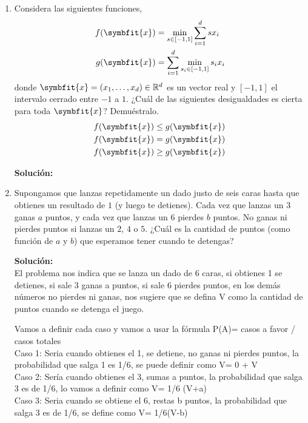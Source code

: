 \documentclass[11pt,letterpaper]{article}
\newenvironment{solution}{%
  \noindent\begin{shaded}
  \textbf{Solución:}\ }{
  \end{shaded}%
}
\newcommand{\bvec}[1]{\symbfit{#1}}
\begin{document}
\begin{enumerate}
\begin{solution}
  \end{solution}
\item%
  Considera las siguientes funciones,
  \[
  \begin{aligned}
    f(\bvec{x}) &= \min_{s\in[-1,1]}\sum_{i=1}^d sx_i \\
    g(\bvec{x}) &= \sum_{i=1}^d \min_{s_i\in[-1,1]} s_ix_i
  \end{aligned}
  \]
  donde \(\bvec{x} = (x_1,\dots,x_d)\in\mathbb{R}^d\) es un
  vector real y \([-1,1]\) el intervalo cerrado entre \(-1\) a
  \(1\). ¿Cuál de las siguientes desigualdades es cierta para toda
  \(\bvec{x}\)?  Demuéstralo.
  \[
  \begin{aligned}
    f(\bvec{x}) &\leq g(\bvec{x}) \\
    f(\bvec{x}) &= g(\bvec{x}) \\
    f(\bvec{x}) &\geq g(\bvec{x})
  \end{aligned}
  \]
  \begin{solution}
  \end{solution}    
\item%
  Supongamos que lanzas repetidamente un dado justo de seis caras
  hasta que obtienes un resultado de \(1\) (y luego te detienes).
  Cada vez que lanzas un \(3\) ganas \(a\) puntos, y cada vez que
  lanzas un \(6\) pierdes \(b\) puntos.  No ganas ni pierdes puntos si
  lanzas un \(2\), \(4\) o \(5\).  ¿Cuál es la cantidad de puntos
  (como función de \(a\) y \(b\)) que esperamos tener cuando te
  detengas?
  \begin{solution}
   \\ El problema nos indica que se lanza un dado de 6 caras, si obtienes 1 se detienes, si sale 3 ganas a puntos, si sale 6 pierdes puntos, en los demás números no pierdes ni ganas, nos sugiere que se defina V como la cantidad de puntos cuando se detenga el juego.

Vamos a definir cada caso y vamos a usar la fórmula P(A)= casos a favor / casos totales\\

Caso 1: Seria cuando obtienes el 1, se detiene, no ganas ni pierdes puntos, la probabilidad que salga 1 es 1/6, se puede definir como V= 0 + V \\

Caso 2: Sería cuando obtienes el 3, sumas a puntos, la probabilidad que salga 3 es de 1/6, lo vamos a definir como V= 1/6 (V+a)\\

Caso 3: Seria cuando se obtiene el 6, restas b puntos, la probabilidad que salga 3 es de 1/6, se define como V= 1/6(V-b)\\


\end{solution}
\end{enumerate}
\end{document}
